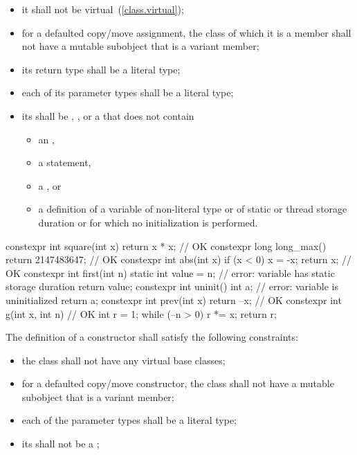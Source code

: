 \begin{itemize}
\item
it shall not be virtual~(\ref{class.virtual});

\item
for a defaulted copy/move assignment, the class of which it is a member
shall not have a mutable subobject that is a variant member;

\item
its return type shall be a literal type;

\item
each of its parameter types shall be a literal type;

\item
its  shall be
, , or
a 
that does not contain

\begin{itemize}
\item an ,
\item a  statement,
\item a , or
\item a definition of a variable
of non-literal type or
of static or thread storage duration or
for which no initialization is performed.
\end{itemize}

\end{itemize}

\enterexample
\begin{codeblock}
constexpr int square(int x) 
  { return x * x; }             // OK
constexpr long long_max() 
  { return 2147483647; }        // OK
constexpr int abs(int x) {
  if (x < 0)
    x = -x;
  return x;                     // OK
}
constexpr int first(int n) {
  static int value = n;         // error: variable has static storage duration
  return value;
}
constexpr int uninit() {
  int a;                        // error: variable is uninitialized
  return a;
}
constexpr int prev(int x)
  { return --x; }               // OK
constexpr int g(int x, int n) { // OK
  int r = 1;
  while (--n > 0) r *= x;
  return r;
}
\end{codeblock}
\exitexample

\pnum
{}%
The definition of a  constructor shall satisfy the
following constraints:

\begin{itemize}
\item
the class shall not have any virtual base classes;

\item
for a defaulted copy/move constructor, the class shall not have a
mutable subobject that is a variant member;

\item
each of the parameter types shall be a literal type;

\item
its  shall not be a ;
\end{itemize}

